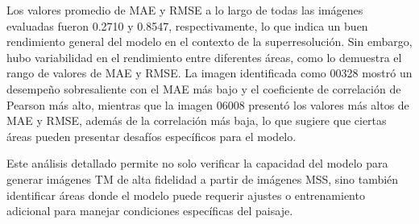             Los valores promedio de MAE y RMSE a lo largo de todas las imágenes evaluadas fueron 0.2710 y 0.8547, respectivamente, lo que indica un buen rendimiento general del modelo en el contexto de la superresolución. Sin embargo, hubo variabilidad en el rendimiento entre diferentes áreas, como lo demuestra el rango de valores de MAE y RMSE. La imagen identificada como 00328 mostró un desempeño sobresaliente con el MAE más bajo y el coeficiente de correlación de Pearson más alto, mientras que la imagen 06008 presentó los valores más altos de MAE y RMSE, además de la correlación más baja, lo que sugiere que ciertas áreas pueden presentar desafíos específicos para el modelo.

            Este análisis detallado permite no solo verificar la capacidad del modelo para generar imágenes TM de alta fidelidad a partir de imágenes MSS, sino también identificar áreas donde el modelo puede requerir ajustes o entrenamiento adicional para manejar condiciones específicas del paisaje.


